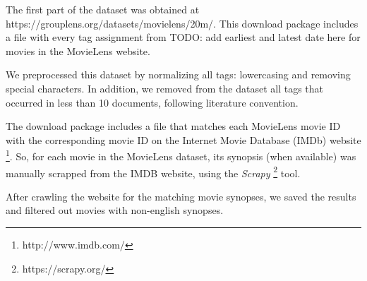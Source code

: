 The first part of the dataset was obtained at https://grouplens.org/datasets/movielens/20m/. This download package includes a file with every tag assignment from {\color{red} TODO: add earliest and latest date here } for movies in the MovieLens website.

We preprocessed this dataset by normalizing all tags: lowercasing and removing special characters. In addition, we removed from the dataset all tags that occurred in less than 10 documents, following literature convention.

The download package includes a file that matches each MovieLens movie ID with the corresponding movie ID on the Internet Movie Database (IMDb) website \footnote{http://www.imdb.com/}. So, for each movie in the MovieLens dataset, its synopsis (when available) was manually scrapped from the IMDB website, using the \textit{Scrapy} \footnote{https://scrapy.org/} tool.

After crawling the website for the matching movie synopses, we saved the results and filtered out movies with non-english synopses.